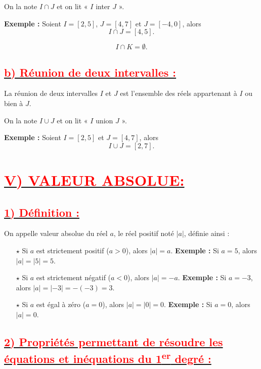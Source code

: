 \documentclass[12pt]{article}
\begin{document}
On la note $I \cap J$ et on lit « $I$ inter $J$ ».

\textbf{Exemple :} Soient $I = [2, 5]$, $J = [4, 7]$ et $J = [-4, 0]$, alors  
\[
I \cap J = [4, 5].
\]

\[
I \cap K = \emptyset.
\]

\subsection*{\underline{\textbf{\textcolor{red}{b) Réunion de deux intervalles :}}}}
La réunion de deux intervalles $I$ et $J$ est l’ensemble des réels appartenant à $I$ ou bien à $J$.

On la note $I \cup J$ et on lit « $I$ union $J$ ».

\textbf{Exemple :} Soient $I = [2, 5]$ et $J = [4, 7]$, alors  
\[
I \cup J = [2, 7].
\]

\section*{\underline{\textbf{\textcolor{red}{V) VALEUR ABSOLUE:}}}}

\subsection*{\underline{\textbf{\textcolor{red}{1) Définition :}}}}
On appelle valeur absolue du réel $a$, le réel positif noté $|a|$, définie ainsi :  
\begin{itemize}
    \item[$\star$] Si $a$ est strictement positif ($a > 0$), alors $|a| = a$.  
    \textbf{Exemple :} Si $a = 5$, alors $|a| = |5| = 5$.
    
    \item[$\star$] Si $a$ est strictement négatif ($a < 0$), alors $|a| = -a$.  
    \textbf{Exemple :} Si $a = -3$, alors $|a| = |-3| = -(-3) = 3$.
    
    \item[$\star$] Si $a$ est égal à zéro ($a = 0$), alors $|a| = |0| = 0$.  
    \textbf{Exemple :} Si $a = 0$, alors $|a| = 0$.
\end{itemize}

\subsection*{\underline{\textbf{\textcolor{red}{2) Propriétés permettant de résoudre les équations et inéquations du 1\textsuperscript{er} degré :}}}}
\end{document}
